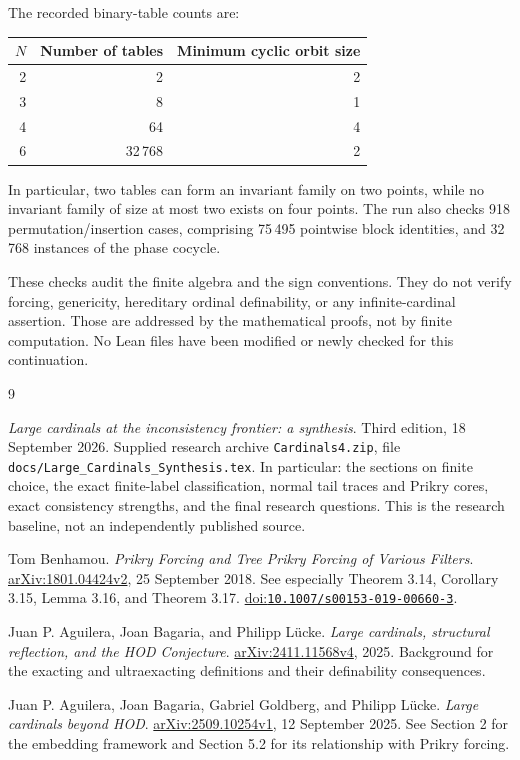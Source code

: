 \documentclass[11pt,letterpaper]{article}
\theoremstyle{definition}
\numberwithin{equation}{section}
\newcommand{\arxiv}[1]{\href{https://arxiv.org/abs/#1}{arXiv:#1}}
\newcommand{\doi}[1]{\href{https://doi.org/#1}{doi:\nolinkurl{#1}}}
\begin{document}
The recorded binary-table counts are:
\begin{center}
\begin{tabular}{@{}rrr@{}}
\toprule
$N$&Number of tables&Minimum cyclic orbit size\\
\midrule
2&2&2\\
3&8&1\\
4&64&4\\
6&32\,768&2\\
\bottomrule
\end{tabular}
\end{center}
In particular, two tables can form an invariant family on two points, while no invariant family of size at most two exists on four points. The run also checks 918 permutation/insertion cases, comprising 75\,495 pointwise block identities, and 32\,768 instances of the phase cocycle.

These checks audit the finite algebra and the sign conventions. They do not verify forcing, genericity, hereditary ordinal definability, or any infinite-cardinal assertion. Those are addressed by the mathematical proofs, not by finite computation. No Lean files have been modified or newly checked for this continuation.

\Needspace{200pt}
\begin{thebibliography}{9}

\emph{Large cardinals at the inconsistency frontier: a synthesis}.
Third edition, 18 September 2026. Supplied research archive
\nolinkurl{Cardinals4.zip}, file
\nolinkurl{docs/Large_Cardinals_Synthesis.tex}.
In particular: the sections on finite choice, the exact finite-label classification, normal tail traces and Prikry cores, exact consistency strengths, and the final research questions.
This is the research baseline, not an independently published source.

Tom Benhamou.
\emph{Prikry Forcing and Tree Prikry Forcing of Various Filters}.
\arxiv{1801.04424v2}, 25 September 2018.
See especially Theorem 3.14, Corollary 3.15, Lemma 3.16, and Theorem 3.17.
\doi{10.1007/s00153-019-00660-3}.

Juan P. Aguilera, Joan Bagaria, and Philipp L\"ucke.
\emph{Large cardinals, structural reflection, and the HOD Conjecture}.
\arxiv{2411.11568v4}, 2025.
Background for the exacting and ultraexacting definitions and their definability consequences.

Juan P. Aguilera, Joan Bagaria, Gabriel Goldberg, and Philipp L\"ucke.
\emph{Large cardinals beyond HOD}.
\arxiv{2509.10254v1}, 12 September 2025.
See Section 2 for the embedding framework and Section 5.2 for its relationship with Prikry forcing.

\end{thebibliography}
\end{document}

